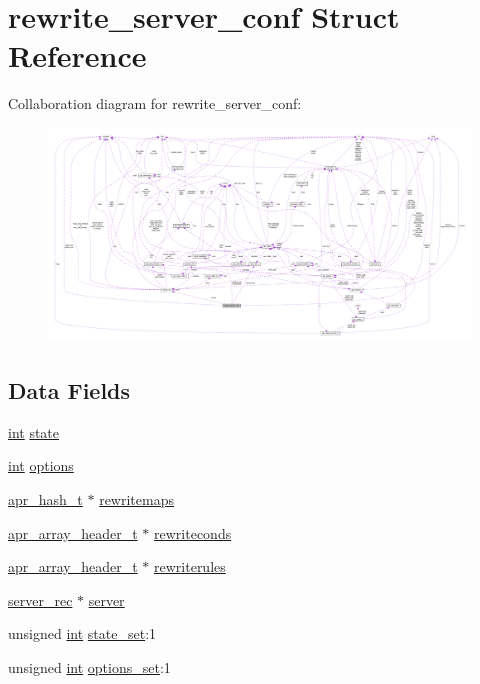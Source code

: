 \hypertarget{structrewrite__server__conf}{}\section{rewrite\+\_\+server\+\_\+conf Struct Reference}
\label{structrewrite__server__conf}


Collaboration diagram for rewrite\+\_\+server\+\_\+conf\+:
\nopagebreak
\begin{figure}[H]
\begin{center}
\leavevmode
\includegraphics[width=350pt]{structrewrite__server__conf__coll__graph}
\end{center}
\end{figure}
\subsection*{Data Fields}
\begin{DoxyCompactItemize}
\item 
\hyperlink{pcre_8txt_a42dfa4ff673c82d8efe7144098fbc198}{int} \hyperlink{structrewrite__server__conf_ada32b9c887543c12dfb62fd0998332c6}{state}
\item 
\hyperlink{pcre_8txt_a42dfa4ff673c82d8efe7144098fbc198}{int} \hyperlink{structrewrite__server__conf_a7276cf88819892b4f851c68d24bd98e2}{options}
\item 
\hyperlink{structapr__hash__t}{apr\+\_\+hash\+\_\+t} $\ast$ \hyperlink{structrewrite__server__conf_a8952d4cb8e29b3569e843134f35f4a9d}{rewritemaps}
\item 
\hyperlink{structapr__array__header__t}{apr\+\_\+array\+\_\+header\+\_\+t} $\ast$ \hyperlink{structrewrite__server__conf_aead2f5817f4960c535dd5f1063617100}{rewriteconds}
\item 
\hyperlink{structapr__array__header__t}{apr\+\_\+array\+\_\+header\+\_\+t} $\ast$ \hyperlink{structrewrite__server__conf_aeeb9a7fb15130a67a5ed78b3485dfe3c}{rewriterules}
\item 
\hyperlink{structserver__rec}{server\+\_\+rec} $\ast$ \hyperlink{structrewrite__server__conf_a9a120a903a2d831ca8e98907a4c548e2}{server}
\item 
unsigned \hyperlink{pcre_8txt_a42dfa4ff673c82d8efe7144098fbc198}{int} \hyperlink{structrewrite__server__conf_a1362f472bc3884608903641218835a64}{state\+\_\+set}\+:1
\item 
unsigned \hyperlink{pcre_8txt_a42dfa4ff673c82d8efe7144098fbc198}{int} \hyperlink{structrewrite__server__conf_adde2ecd9d249856b9170946b379ebd6f}{options\+\_\+set}\+:1
\end{DoxyCompactItemize}


